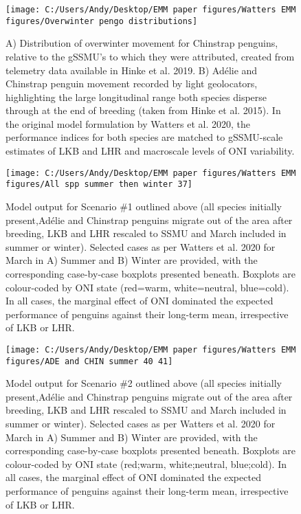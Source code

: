 \documentclass[]{elsarticle} %
\begin{document}
\begin{figure}
\texttt{[image: C:/Users/Andy/Desktop/EMM paper figures/Watters EMM figures/Overwinter pengo distributions]} \caption{A) Distribution of overwinter movement for Chinstrap penguins, relative to the gSSMU's to which they were attributed, created from telemetry data available in Hinke et al. 2019.  B) Adélie and Chinstrap penguin movement recorded by light geolocators, highlighting the large longitudinal range both species disperse through at the end of breeding (taken from Hinke et al. 2015).  In the original model formulation by Watters et al. 2020, the performance indices for both species are matched to gSSMU-scale estimates of LKB and LHR and macroscale levels of ONI variability.}\label{fig:Overwinter penguin distribution plots}
\end{figure}

\begin{figure}

\texttt{[image: C:/Users/Andy/Desktop/EMM paper figures/Watters EMM figures/All spp summer then winter 37]} \hfill{}

\caption{Model output for Scenario \#1 outlined above (all species initially present,Adélie and Chinstrap penguins migrate out of the area after breeding, LKB and LHR rescaled to SSMU and March included in summer or winter).   Selected cases as per Watters et al. 2020 for March in A) Summer and B) Winter are provided, with the corresponding case-by-case boxplots presented beneath.  Boxplots are colour-coded by ONI state (red=warm, white=neutral, blue=cold).  In all cases, the marginal effect of ONI dominated the expected performance of penguins against their long-term mean, irrespective of LKB or LHR.}\label{fig:Scenario plot 1}
\end{figure}

\begin{figure}

\texttt{[image: C:/Users/Andy/Desktop/EMM paper figures/Watters EMM figures/ADE and CHIN summer 40 41]} \hfill{}

\caption{Model output for Scenario \#2 outlined above (all species initially present,Adélie and Chinstrap penguins migrate out of the area after breeding, LKB and LHR rescaled to SSMU and March included in summer or winter).   Selected cases as per Watters et al. 2020 for March in A) Summer and B) Winter are provided, with the corresponding case-by-case boxplots presented beneath.  Boxplots are colour-coded by ONI state (red;warm, white;neutral, blue;cold).  In all cases, the marginal effect of ONI dominated the expected performance of penguins against their long-term mean, irrespective of LKB or LHR.}\label{fig:Scenario plot 2}
\end{figure}
\end{document}
